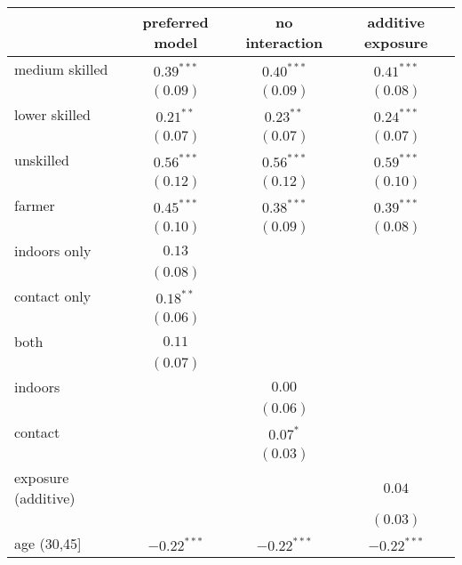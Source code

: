 
\begin{table}
\begin{center}
\begin{tabular}{l c c c}
\hline
 & preferred model & no interaction & additive exposure \\
\hline
medium skilled      & $0.39^{***}$  & $0.40^{***}$  & $0.41^{***}$  \\
                    & $(0.09)$      & $(0.09)$      & $(0.08)$      \\
lower skilled       & $0.21^{**}$   & $0.23^{**}$   & $0.24^{***}$  \\
                    & $(0.07)$      & $(0.07)$      & $(0.07)$      \\
unskilled           & $0.56^{***}$  & $0.56^{***}$  & $0.59^{***}$  \\
                    & $(0.12)$      & $(0.12)$      & $(0.10)$      \\
farmer              & $0.45^{***}$  & $0.38^{***}$  & $0.39^{***}$  \\
                    & $(0.10)$      & $(0.09)$      & $(0.08)$      \\
indoors only        & $0.13$        &               &               \\
                    & $(0.08)$      &               &               \\
contact only        & $0.18^{**}$   &               &               \\
                    & $(0.06)$      &               &               \\
both                & $0.11$        &               &               \\
                    & $(0.07)$      &               &               \\
indoors             &               & $0.00$        &               \\
                    &               & $(0.06)$      &               \\
contact             &               & $0.07^{*}$    &               \\
                    &               & $(0.03)$      &               \\
exposure (additive) &               &               & $0.04$        \\
                    &               &               & $(0.03)$      \\
age (30,45]         & $-0.22^{***}$ & $-0.22^{***}$ & $-0.22^{***}$ \\

\end{tabular}
\end{center}
\end{table}
